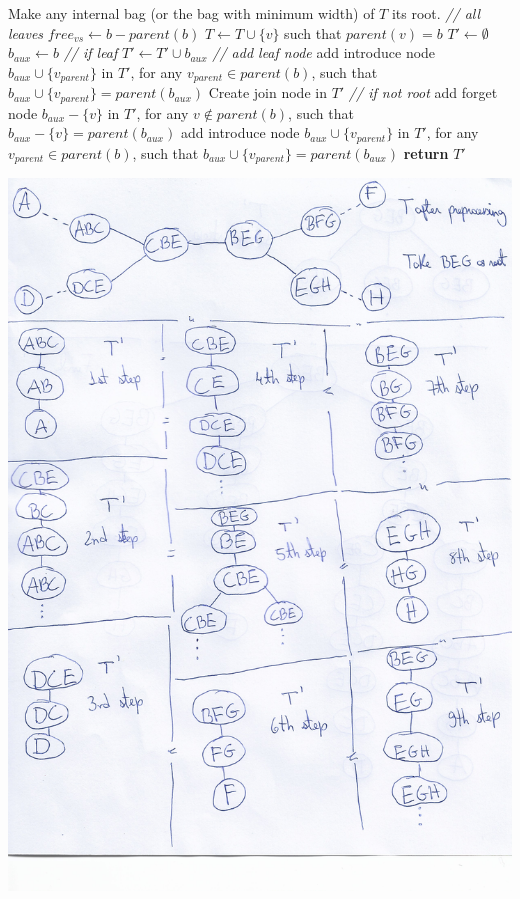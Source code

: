 \documentclass{article}
\begin{document}
\begin{algorithmic}
\State Make any internal bag (or the bag with minimum width) of $T$ its root.
 \textit{// all leaves}
  \State $free_{vs} \gets b - parent(b)$
    \State $T \gets T \cup \{v \}$ such that $parent(v) = b$
  \EndFor
\EndFor
\State $T' \gets \emptyset $
  \State $b_{aux} \gets b$
   \textit{// if leaf}
    \State $T' \gets T' \cup b_{aux}$ \textit{// add leaf node}
      \State add introduce node $b_{aux} \cup \{ v_{parent}\} $ in $T'$, for any $ v_{parent} \in parent(b)$,
      \State such that $b_{aux} \cup \{ v_{parent}\} = parent(b_{aux})$
    \EndWhile
  \Else
    \State Create join node in $T'$
     \textit{// if not root}
      \State add forget node $b_{aux} - \{ v\} $ in $T'$, for any $ v \notin parent(b)$,
      \State such that $b_{aux} - \{ v\} = parent(b_{aux})$
      \EndWhile
      \State add introduce node $b_{aux} \cup \{ v_{parent}\} $ in $T'$,
      \State for any $ v_{parent} \in parent(b)$, such that $b_{aux} \cup \{ v_{parent}\} = parent(b_{aux})$
    \EndWhile
    \EndIf
  \EndIf
\State
\EndFor
\State \textbf{return} $T'$
\end{algorithmic} 
\includegraphics[scale=0.7]{1st_demo_graph_hw3}
\end{document}

